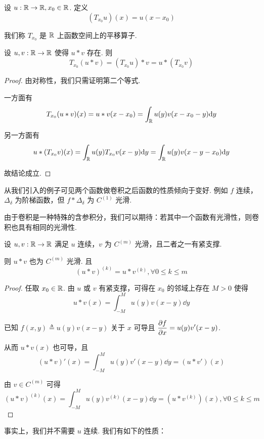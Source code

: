 
设 $u:\mathbb{R}\to\mathbb{R},x_0\in\mathbb{R}$. 定义
$$
(T_{x_0}u)(x)=u(x-x_0)
$$

我们称 $T_{x_0}$ 是 $\mathbb{R}$ 上函数空间上的平移算子.

\begin{property}
    设 $u,v:\mathbb{R}\to\mathbb{R}$ 使得 $u*v$ 存在. 则
$$
T_{x_0}(u*v)=(T_{x_0}u)*v=u*(T_{x_0}v)
$$
\end{property}
\begin{proof}
    由对称性，我们只需证明第二个等式.

    一方面有
$$
T_{x_0}(u*v)(x)=u*v(x-x_0)=\int_{\mathbb{R}} u(y)v(x-x_0-y)\mathrm{d} y
$$

    另一方面有
$$
u*(T_{x_0}v)(x)=\int_{\mathbb{R}} u(y)T_{x_0}v(x-y)\mathrm{d} y=\int_{\mathbb{R}} u(y)v(x-y-x_0)\mathrm{d} y
$$

    故结论成立.
\end{proof}


从我们引入的例子可见两个函数做卷积之后函数的性质倾向于变好. 例如 $f$ 连续，$\Delta_\delta$ 为阶梯函数，但 $f*\Delta_\delta$ 为 $C^{(1)}$ 光滑.

由于卷积是一种特殊的含参积分，我们可以期待：若其中一个函数有光滑性，则卷积也具有相同的光滑性.

\begin{property}
    设 $u,v:\mathbb{R}\to\mathbb{R}$ 满足 $u$ 连续，$v$ 为 $C^{(m)}$ 光滑，且二者之一有紧支撑.

    则 $u*v$ 也为 $C^{(m)}$ 光滑. 且
$$
(u*v)^{(k)}=u*v^{(k)},\forall 0\le k\le m
$$
\end{property}
\begin{proof}
    任取 $x_0\in\mathbb{R}$. 由 $u$ 或 $v$ 有紧支撑，可得在 $x_0$ 的邻域上存在 $M>0$ 使得
$$
u*v(x)=\int_{-M}^Mu(y)v(x-y)\dd y
$$

    已知 $f(x,y)\triangleq u(y)v(x-y)$ 关于 $x$ 可导且 $\displaystyle\frac{\partial{f}}{\partial{x}}=u(y)v'(x-y)$.

    从而 $u*v(x)$ 也可导，且
$$
(u*v)'(x)=\int_{-M}^Mu(y)v'(x-y)\dd y=(u*v')(x)
$$

    由 $v\in C^{(m)}$ 可得
$$
(u*v)^{(k)}(x)=\int_{-M}^M u(y)v^{(k)}(x-y)\dd y=(u*v^{(k)})(x),\forall 0\le k\le m
$$
\end{proof}

事实上，我们并不需要 $u$ 连续. 我们有如下的性质：

